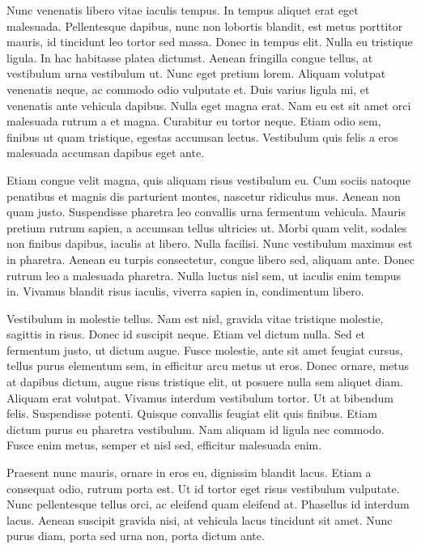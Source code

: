 Nunc venenatis libero vitae iaculis tempus. In tempus aliquet erat eget malesuada. Pellentesque dapibus, nunc non lobortis blandit, est metus porttitor mauris, id tincidunt leo tortor sed massa. Donec in tempus elit. Nulla eu tristique ligula. In hac habitasse platea dictumst. Aenean fringilla congue tellus, at vestibulum urna vestibulum ut. Nunc eget pretium lorem. Aliquam volutpat venenatis neque, ac commodo odio vulputate et. Duis varius ligula mi, et venenatis ante vehicula dapibus. Nulla eget magna erat. Nam eu est sit amet orci malesuada rutrum a et magna. Curabitur eu tortor neque. Etiam odio sem, finibus ut quam tristique, egestas accumsan lectus. Vestibulum quis felis a eros malesuada accumsan dapibus eget ante.

Etiam congue velit magna, quis aliquam risus vestibulum eu. Cum sociis natoque penatibus et magnis dis parturient montes, nascetur ridiculus mus. Aenean non quam justo. Suspendisse pharetra leo convallis urna fermentum vehicula. Mauris pretium rutrum sapien, a accumsan tellus ultricies ut. Morbi quam velit, sodales non finibus dapibus, iaculis at libero. Nulla facilisi. Nunc vestibulum maximus est in pharetra. Aenean eu turpis consectetur, congue libero sed, aliquam ante. Donec rutrum leo a malesuada pharetra. Nulla luctus nisl sem, ut iaculis enim tempus in. Vivamus blandit risus iaculis, viverra sapien in, condimentum libero.

Vestibulum in molestie tellus. Nam est nisl, gravida vitae tristique molestie, sagittis in risus. Donec id suscipit neque. Etiam vel dictum nulla. Sed et fermentum justo, ut dictum augue. Fusce molestie, ante sit amet feugiat cursus, tellus purus elementum sem, in efficitur arcu metus ut eros. Donec ornare, metus at dapibus dictum, augue risus tristique elit, ut posuere nulla sem aliquet diam. Aliquam erat volutpat. Vivamus interdum vestibulum tortor. Ut at bibendum felis. Suspendisse potenti. Quisque convallis feugiat elit quis finibus. Etiam dictum purus eu pharetra vestibulum. Nam aliquam id ligula nec commodo. Fusce enim metus, semper et nisl sed, efficitur malesuada enim.

Praesent nunc mauris, ornare in eros eu, dignissim blandit lacus. Etiam a consequat odio, rutrum porta est. Ut id tortor eget risus vestibulum vulputate. Nunc pellentesque tellus orci, ac eleifend quam eleifend at. Phasellus id interdum lacus. Aenean suscipit gravida nisi, at vehicula lacus tincidunt sit amet. Nunc purus diam, porta sed urna non, porta dictum ante.

